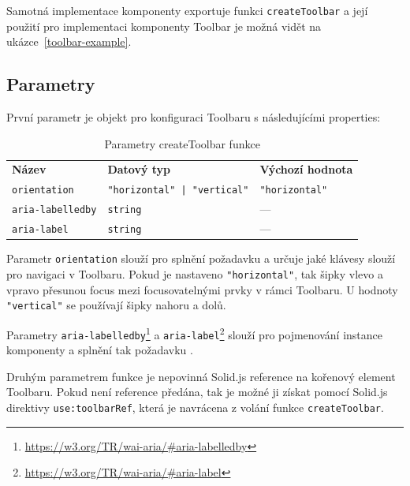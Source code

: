 Samotná implementace komponenty exportuje funkci \texttt{createToolbar} a její použití pro implementaci komponenty Toolbar je možná vidět na ukázce~\ref{toolbar-example}.

\clearpage

\subsection{Parametry}

První parametr je objekt pro konfiguraci Toolbaru s následujícími properties:

\begin{table}[ht]
    \begin{ctucolortab}
        \begin{tabularx}{\textwidth}{X X X}
            \bfseries Název          & \bfseries Datový typ               & \bfseries Výchozí hodnota \\\Midrule{}
            \texttt{orientation}     & \texttt{"horizontal" | "vertical"} & \texttt{"horizontal"}     \\
            \texttt{aria-labelledby} & \texttt{string}                    & ---                       \\
            \texttt{aria-label}      & \texttt{string}                    & ---
        \end{tabularx}
    \end{ctucolortab}
    \caption{Parametry createToolbar funkce}
    \label{table:toolbar-params}
\end{table}

Parametr \texttt{orientation} slouží pro splnění požadavku \hyperref[tfr12]{} a určuje jaké klávesy slouží pro navigaci v Toolbaru.
Pokud je nastaveno \texttt{"horizontal"}, tak šipky vlevo a vpravo přesunou focus mezi focusovatelnými prvky v rámci Toolbaru.
U hodnoty \texttt{"vertical"} se používají šipky nahoru a dolů.

Parametry \texttt{aria-labelledby}\footnote{\url{https://w3.org/TR/wai-aria/\#aria-labelledby}} a \texttt{aria-label}\footnote{\url{https://w3.org/TR/wai-aria/\#aria-label}} slouží pro pojmenování instance komponenty a splnění tak požadavku \href{ofr13}{}.

Druhým parametrem funkce je nepovinná Solid.js reference na kořenový element Toolbaru.
Pokud není reference předána, tak je možné ji získat pomocí Solid.js direktivy \texttt{use:toolbarRef}, která je navrácena z volání funkce \texttt{createToolbar}.

